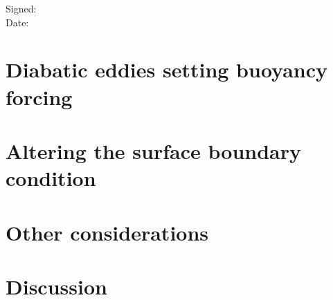 \documentclass[a4paper,12pt, openright, titlepage]{book}
\begin{document}
Signed:\hrulefill\\%


Date:\hrulefill\\
\clearpage
\tableofcontents
\clearpage
\listoftables
\listoffigures

\clearpage
{}
\setcounter{page}{1}
\mainmatter


\chapter[Diabatic eddies]{Diabatic eddies setting buoyancy forcing}

\chapter[Surface Conditions]{Altering the surface boundary condition}


\newpage

\chapter[Other Considerations]{Other considerations}

\chapter{Discussion}


\backmatter
{} 
\end{document}
